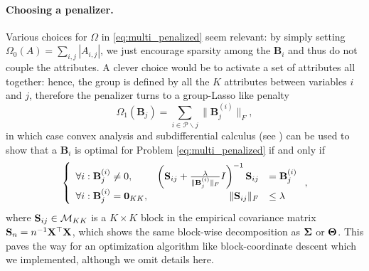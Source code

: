 \paragraph{Choosing  a penalizer.}   Various choices  for $\Omega$  in
\eqref{eq:multi_penalized}   seem   relevant:    by   simply   setting
$\Omega_0(A) = \sum_{i,j} |A_{i,j}|$, we just encourage sparsity among
the $\mathbf{B}_i$  and thus do  not couple the attributes.   A clever
choice would be to activate a set of attributes all together: hence, the
group is defined  by all the $K$ attributes between  variables $i$ and $j$,
therefore the penalizer turns to a group-Lasso like penalty
\begin{equation}
  \label{eq:penalty_grp_variate}
  \Omega_1(\mathbf{B}_j) = \sum_{i \in \mathcal{P}\backslash j} \|\mathbf{B}_j^{(i)}\|_F,
\end{equation}
in  which  case  convex  analysis  and  subdifferential  calculus  (see
\cite{2006_CO_Boyd})  can be  used to  show that  a $\mathbf{B}_i$  is
optimal for Problem \eqref{eq:multi_penalized} if and only if
\begin{equation}
  \label{eq:optimality}
  \left\{\begin{array}{lrl}
      \forall i : \mathbf{B}_j^{(i)} \neq 0, & \left(\mathbf{S}_{ij} +
        \frac{\lambda}{\|\mathbf{B}_j^{(i)}\|_F           }          I
      \right)^{-1} \mathbf{S}_{ij} & = \mathbf{B}_j^{(i)} \\ 
      \forall i : \mathbf{B}_j^{(i)} = \bzr_{KK}, & 
      \| \mathbf{S}_{ij} \|_F & \leq \lambda \\
  \end{array}\right.,
\end{equation}
where  $\mathbf{S}_{ij}\in\mathcal{M}_{KK}$ is  a  $K\times K$  block in  the
empirical covariance matrix $\mathbf{S}_n  = n^{-1} \mathbf{X}^\top\mathbf{X}$, which shows
the  same block-wise  decomposition as  ${\boldsymbol\Sigma}$ or  $\boldsymbol\Theta$.  This
paves  the way  for  an optimization  algorithm like  block-coordinate
descent which we implemented, although we omit details here.


